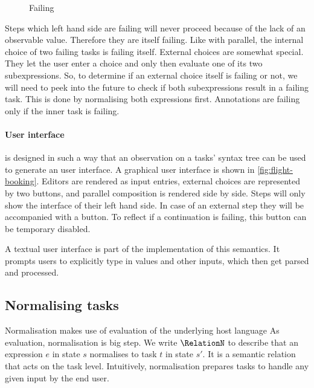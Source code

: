 \begin{figure}[h]
  \small
  \caption{Failing} \label{fig:observation-failing}
\end{figure}

Steps which left hand side are failing will never proceed because of the lack of an observable value.
Therefore they are itself failing.
Like with parallel, the internal choice of two failing tasks is failing itself.
External choices are somewhat special.
They let the user enter a choice and only then evaluate one of its two subexpressions.
So, to determine if an external choice itself is failing or not,
we will need to peek into the future to check if both subexpressions result in a failing task.
This is done by normalising both expressions first.
Annotations are failing only if the inner task is failing.



\paragraph{User interface}

\TOPHAT is designed in such a way that an observation on a tasks' syntax tree can be used to generate an user interface.
A graphical user interface is shown in \autoref{fig:flight-booking}.
Editors are rendered as \HTML input entries,
external choices are represented by two buttons,
and parallel composition is rendered side by side.
Steps will only show the interface of their left hand side.
In case of an external step they will be accompanied with a button.
To reflect if a continuation is failing, this button can be temporary disabled.

A textual user interface is part of the implementation of this semantics.
It prompts users to explicitly type in values and other inputs,
which then get parsed and processed.



\subsection{Normalising tasks}
\label{sec:normalise}

Normalisation makes use of evaluation of the underlying host language
As evaluation, normalisation is big step.
We write $\RelationN$ to describe that
an expression $e$ in state $s$ normalises to task $t$ in state $s'$.
It is a semantic relation that acts on the task level.
Intuitively, normalisation prepares tasks to handle any given input by the end user.

